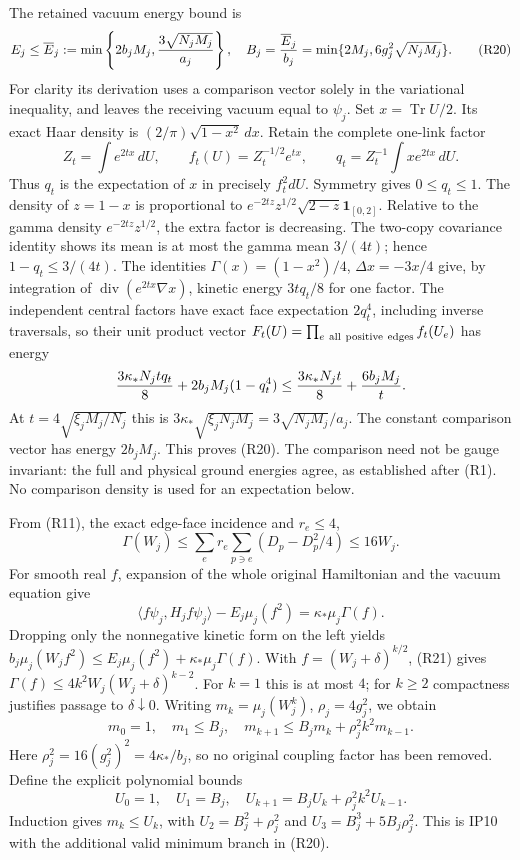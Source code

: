 \documentclass[11pt]{article}
\begin{document}
The retained vacuum energy bound is
\[
 E_j\le\overline E_j
 :=\min\left\{2b_jM_j,{3\sqrt{N_jM_j}\over a_j}\right\},\quad
 B_j={\overline E_j\over b_j}
 =\min\{2M_j,6g_j^2\sqrt{N_jM_j}\}.
 \tag{R20}
\]
For clarity its derivation uses a comparison vector solely in the
variational inequality, and leaves the receiving vacuum equal to
\(\psi_j\). Set \(x=\operatorname{Tr}U/2\). Its exact Haar density
is \((2/\pi)\sqrt{1-x^2}\,dx\). Retain the complete one-link factor
\[
 Z_t=\int e^{2tx}\,dU,\qquad f_t(U)=Z_t^{-1/2}e^{tx},\qquad
 q_t=Z_t^{-1}\int x e^{2tx}\,dU.
\]
Thus \(q_t\) is the expectation of \(x\) in precisely \(f_t^2dU\).
Symmetry gives \(0\le q_t\le1\). The density of
\(z=1-x\) is proportional to
\(e^{-2tz}z^{1/2}\sqrt{2-z}\mathbf1_{[0,2]}\).
Relative to the gamma density \(e^{-2tz}z^{1/2}\), the extra
factor is decreasing. The two-copy covariance identity shows its
mean is at most the gamma mean \(3/(4t)\); hence
\(1-q_t\le3/(4t)\).
The identities \(\Gamma(x)=(1-x^2)/4\), \(\Delta x=-3x/4\)
give, by integration of \(\operatorname{div}(e^{2tx}\nabla x)\),
kinetic energy \(3tq_t/8\) for one factor.
The independent central factors have exact face expectation
\(2q_t^4\), including inverse traversals, so their unit product vector
\(F_t(U)=\prod_{e\ {\rm all\ positive\ edges}}f_t(U_e)\) has energy
\[
 {3\kappa_*N_jtq_t\over8}
       +2b_jM_j(1-q_t^4)
 \le {3\kappa_*N_jt\over8}+{6b_jM_j\over t}.
\]
At \(t=4\sqrt{\xi_jM_j/N_j}\) this is
\(3\kappa_*\sqrt{\xi_jN_jM_j}=3\sqrt{N_jM_j}/a_j\).
The constant comparison vector has energy \(2b_jM_j\).
This proves (R20). The comparison need not be gauge invariant:
the full and physical ground energies agree, as established after (R1).
No comparison density is used for an expectation below.

From (R11), the exact edge-face incidence and \(r_e\le4\),
\[
 \Gamma(W_j)\le
 \sum_e r_e\sum_{p\ni e}(D_p-D_p^2/4)
 \le16W_j. \tag{R21}
\]
For smooth real \(f\), expansion of the whole original Hamiltonian
and the vacuum equation give
\[
 \langle f\psi_j,H_jf\psi_j\rangle-E_j\mu_j(f^2)
       =\kappa_*\mu_j\Gamma(f).
\]
Dropping only the nonnegative kinetic form on the left yields
\(b_j\mu_j(W_j f^2)\le E_j\mu_j(f^2)+\kappa_*\mu_j\Gamma(f)\).
With \(f=(W_j+\delta)^{k/2}\), (R21) gives
\(\Gamma(f)\le4k^2W_j(W_j+\delta)^{k-2}\).
For \(k=1\) this is at most \(4\); for \(k\ge2\) compactness
justifies passage to \(\delta\downarrow0\).
Writing \(m_k=\mu_j(W_j^k)\), \(\rho_j=4g_j^2\), we obtain
\[
 m_0=1,\quad m_1\le B_j,\quad
 m_{k+1}\le B_jm_k+\rho_j^2k^2m_{k-1}.
 \tag{R22}
\]
Here \(\rho_j^2=16(g_j^2)^2=4\kappa_*/b_j\), so no original
coupling factor has been removed.
Define the explicit polynomial bounds
\[
 U_0=1,\quad U_1=B_j,\quad
 U_{k+1}=B_jU_k+\rho_j^2k^2U_{k-1}.
 \tag{R23}
\]
Induction gives \(m_k\le U_k\), with
\(U_2=B_j^2+\rho_j^2\) and
\(U_3=B_j^3+5B_j\rho_j^2\).
This is IP10 with the additional valid minimum branch in (R20).
\end{document}
